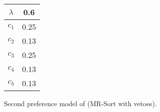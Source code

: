\begin{figure}
\begin{minipage}[c]{0.07\columnwidth}
\begin{tabular}{c|c}
$\lambda$ & 0.6 \\\hline
$c_1$ & 0.25 \\
$c_2$ & 0.13 \\
$c_3$ & 0.25 \\
$c_4$ & 0.13 \\
$c_5$ & 0.13 \\
\end{tabular}
\end{minipage}

	
\caption{Second preference model of \GJ (MR-Sort with vetoes).}\label{fig:ex1-model2}
\end{figure}